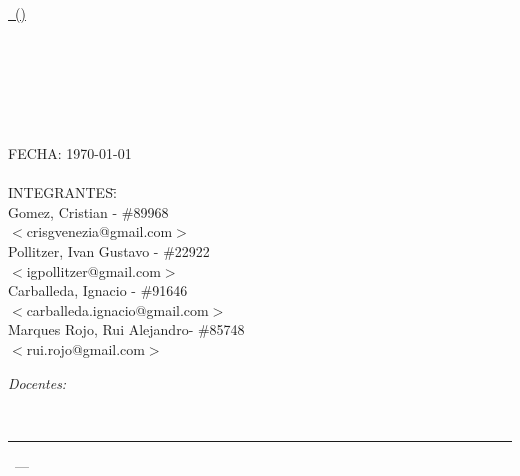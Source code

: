 \begin{titlepage}
\begin{center}
\end{center}

\vfill

\begin{center}
\underline{\Large{\nombreMateria\, (\codigoMateria)}}
\end{center}

\vfill
\begin{center}

\end{center}
\vfill

\begin{center}
\Huge{\textsc{ \tituloTP }}\\[.5cm]
	\begin{figure}[H]
		\centering
	\end{figure}\HRule \\[0.1cm]
\Huge{\textbf{\descripcionTP}}\\[0.01cm]
\HRule\\[0.3cm]
\end{center}

\vfill



\begin{tabbing}
	FECHA: \today\\
\\
	INTEGRANTES:\hspace{-1cm}\=\+\hspace{1cm}\=\hspace{6cm}\=\\
		Gomez, Cristian	\>\>- \#89968\\
			\>\footnotesize{$<$crisgvenezia@gmail.com$>$}\\
		Pollitzer, Ivan Gustavo	\>\>- \#22922\\
			\>\footnotesize{$<$igpollitzer@gmail.com$>$}\\
		Carballeda, Ignacio	\>\>- \#91646\\
			\>\footnotesize{$<$carballeda.ignacio@gmail.com$>$}\\
		Marques Rojo, Rui Alejandro\>\>- \#85748\\
			\>\footnotesize{$<$rui.rojo@gmail.com$>$}\\			

\end{tabbing}

\begin{flushleft} \large
\emph{Docentes:}\\[.2cm]
\end{flushleft}
\begin{tabbing}
\docentes\\[.5cm]
\end{tabbing}

\vfill

\hrule
\vspace{0.2cm}

\noindent\small{\codigoMateria\, --- \nombreMateria \hfill \facultad}

\end{titlepage}
